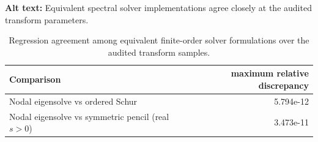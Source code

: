 \begin{table}[ht]
\centering
\caption{Regression agreement among equivalent finite-order solver formulations over the audited transform samples.}
\par\raggedright\textbf{Alt text:} Equivalent spectral solver implementations agree closely at the audited transform parameters.\par\centering

\label{tab:solver_regression}
\begin{tabular}{lr}
\toprule
Comparison & maximum relative discrepancy\\
\midrule
Nodal eigensolve vs ordered Schur & 5.794e-12\\
Nodal eigensolve vs symmetric pencil (real $s>0$) & 3.473e-11\\
\bottomrule
\end{tabular}
\end{table}
